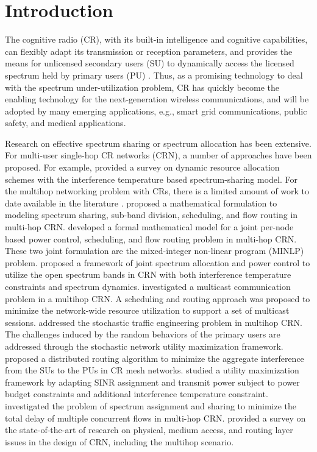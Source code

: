 \documentclass[12pt,onecolumn,tworows]{IEEEtran}
\begin{document}
\IEEEpeerreviewmaketitle
\newpage

\section{Introduction}

The cognitive radio (CR), with its built-in intelligence and cognitive capabilities,
can flexibly adapt its transmission or reception parameters, and
provides the means for unlicensed secondary users (SU)
to dynamically access the licensed spectrum held by primary users (PU) \cite{Haykin2005}.
Thus, as a promising technology to deal with the spectrum under-utilization problem, CR has quickly become the enabling technology for the next-generation wireless communications, and will be adopted by many emerging applications, e.g., smart grid communications, public safety, and medical applications\cite{WangGhosh}.



Research on effective spectrum sharing or spectrum
allocation has been extensive. For multi-user single-hop CR networks (CRN), a number of approaches have been proposed.
For example, \cite{ZhangSPM2010} provided a survey on dynamic resource allocation schemes with the interference temperature based spectrum-sharing model.
For the multihop networking problem with CRs, there is
a limited amount of work to date available in the literature \cite{Hou2008,Shiyi2008,Wang2011,GaoShi2011,YangSong2010,JSAC2013Routing,JSAC2013Duality,JSAC2013Delay,LiangSurvey}.
\cite{Hou2008} proposed a mathematical formulation to modeling spectrum sharing, sub-band division, scheduling, and flow routing in multi-hop CRN.
\cite{Shiyi2008}  developed a formal mathematical model for a joint per-node based power control, scheduling, and flow routing problem in multi-hop CRN. These two joint formulation are the mixed-integer non-linear program (MINLP) problem.
\cite{Wang2011} proposed a framework of joint spectrum allocation and power control to utilize the open spectrum bands in CRN with both interference temperature constraints and spectrum dynamics.
\cite{GaoShi2011} investigated a multicast communication problem in a multihop CRN. A scheduling and routing approach was proposed to minimize the network-wide resource utilization to support a set of multicast sessions.
\cite {YangSong2010} addressed the stochastic traffic engineering problem in multihop CRN. The challenges induced by the random behaviors of the primary users are addressed through the stochastic network utility maximization framework.
\cite{JSAC2013Routing} proposed a distributed routing algorithm to minimize the aggregate interference from the SUs to the PUs in CR mesh networks.
\cite{JSAC2013Duality} studied a utility maximization framework by adapting SINR assignment and transmit power subject to power budget constraints and additional interference temperature constraint.
\cite{JSAC2013Delay} investigated the problem of spectrum assignment and sharing to minimize the total delay of multiple concurrent flows in multi-hop CRN.
\cite{LiangSurvey} provided a survey on the state-of-the-art of research on physical, medium access, and routing layer issues in the design of CRN, including the multihop scenario.
\end{document}
